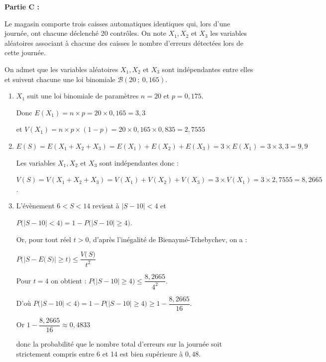 \documentclass[10pt]{article}
\providecommand{\np}[2][]{{#2~#1}}
\begin{document}
\textbf{Partie C : }

Le magasin comporte trois caisses automatiques identiques qui, lors d'une journée, ont chacune déclenché 20 contrôles. On note $X_{1}, X_{2}$ et $X_{3}$ les variables aléatoires associant à chacune des caisses le nombre d'erreurs détectées lors de cette journée.

On admet que les variables aléatoires $X_{1}, X_{2}$ et $X_{3}$ sont indépendantes entre elles et suivent chacune une loi binomiale $\mathcal{B}(20~;~0,165)$.

\begin{enumerate}
\item  $X_1$ suit une loi binomiale de paramètres $n=20$ et $p=0,175$. 

Donc $E\left( X_1\right) = n\times p = 20 \times 0,165 = 3,3$ 

et $V\left( X_1\right) = n\times p \times (1-p) = 20 \times 0,165 \times 0,835 = \np{2,7555}$ 

\item $E(S)=E\left(X_{1}+X_{2}+X_{3}\right) = E\left( X_1\right) +E\left( X_2\right)+E\left( X_3\right) = 3 \times E\left( X_1\right) = 3 \times 3,3 = 9,9$ 

Les variables $X_{1}, X_{2}$ et $X_{3}$ sont indépendantes donc : 

$V(S)=V\left(X_{1}+X_{2}+X_{3}\right) = V\left( X_1\right) +V\left( X_2\right)+V\left( X_3\right) = 3 \times V\left( X_1\right) = 3 \times 2,7555 =\np{8,2665}$.
\item L'évènement \og $6 <S< 14$ \fg{} revient à $\big|S - 10\big| < 4$ et

$P\Big(\big|S- 10 \big| < 4\Big) = 1 - P\Big(\big|S - 10 \big| \geqslant 4\Big)$.

Or, pour tout réel $t>0$, d'après l'inégalité de Bienaymé-Tchebychev, on a :

$P\Big(\big|S-E\big(\,S\big)\big| \geqslant t\Big) \leqslant \dfrac{V\big(\,S\big)}{t^2}$

Pour $t = 4$ on obtient : $P\Big(\big|S-10\big| \geqslant 4\Big)\leqslant \dfrac{8,2665}{4^2}$.

D'où $P\Big(\big|S- 10 \big| < 4\Big) = 1 - P\Big(\big|S - 10 \big| \geqslant 4\Big) \geqslant 1- \dfrac{8,2665}{16}$.

Or $1 - \dfrac{8,2665}{16} \approx \np{0,4833}$

donc la probabilité que le nombre total d'erreurs sur la journée soit strictement compris entre 6 et 14 est bien supérieure à $0,48$.
\end{enumerate}
\medskip
\end{document}
